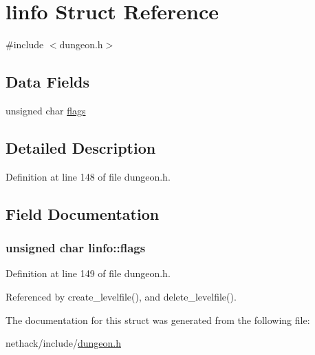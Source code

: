 \hypertarget{structlinfo}{\section{linfo Struct Reference}
\label{structlinfo}
}


{\ttfamily \#include $<$dungeon.\+h$>$}

\subsection*{Data Fields}
\begin{DoxyCompactItemize}
\item 
unsigned char \hyperlink{structlinfo_a866d6f09d62ac17e8ed880c55a4a7f88}{flags}
\end{DoxyCompactItemize}


\subsection{Detailed Description}


Definition at line 148 of file dungeon.\+h.



\subsection{Field Documentation}
\hypertarget{structlinfo_a866d6f09d62ac17e8ed880c55a4a7f88}{
\subsubsection[{flags}]{\setlength{\rightskip}{0pt plus 5cm}unsigned char linfo\+::flags}}\label{structlinfo_a866d6f09d62ac17e8ed880c55a4a7f88}


Definition at line 149 of file dungeon.\+h.



Referenced by create\+\_\+levelfile(), and delete\+\_\+levelfile().



The documentation for this struct was generated from the following file\+:\begin{DoxyCompactItemize}
\item 
nethack/include/\hyperlink{dungeon_8h}{dungeon.\+h}\end{DoxyCompactItemize}
